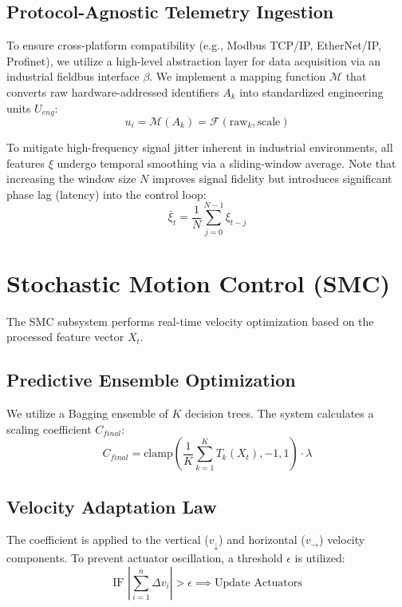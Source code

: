 \documentclass[letterpaper]{article}
\begin{document}
\subsection{Protocol-Agnostic Telemetry Ingestion}
To ensure cross-platform compatibility (e.g., Modbus TCP/IP, EtherNet/IP, Profinet), we utilize a high-level abstraction layer for data acquisition via
an industrial fieldbus interface $\beta$. We implement a mapping function $\mathcal{M}$ that converts raw hardware-addressed identifiers $A_k$ into
standardized engineering units $U_{eng}$:
\begin{equation}
    u_i = \mathcal{M}(A_k) = \mathcal{F}(\text{raw}_k, \text{scale})
\end{equation}

To mitigate high-frequency signal jitter inherent in industrial environments, all features $\xi$ undergo temporal smoothing via a sliding-window
average. Note that increasing the window size $N$ improves signal fidelity but introduces significant phase lag (latency) into the control loop:
\begin{equation}
\bar{\xi}_t = \frac{1}{N} \sum_{j=0}^{N-1} \xi_{t-j}
\end{equation}

\section{Stochastic Motion Control (SMC)}
The SMC subsystem performs real-time velocity optimization based on the processed feature vector $X_t$.

\subsection{Predictive Ensemble Optimization}
We utilize a Bagging ensemble of $K$ decision trees. The system calculates a scaling coefficient $C_{final}$:
\begin{equation}
    C_{final} = \text{clamp}\left(\frac{1}{K} \sum_{k=1}^{K} T_k(X_t), -1, 1\right) \cdot \lambda
\end{equation}

\subsection {Velocity Adaptation Law}
The coefficient is applied to the vertical ($v_{\downarrow}$) and horizontal ($v_{\rightarrow}$) velocity components. To prevent actuator oscillation,
a threshold $\epsilon$ is utilized:
\begin{equation}
    \text{IF } |\sum_{i=1}^{n} \Delta v_i| > \epsilon \implies \text{Update Actuators}
\end{equation}
\end{document}
